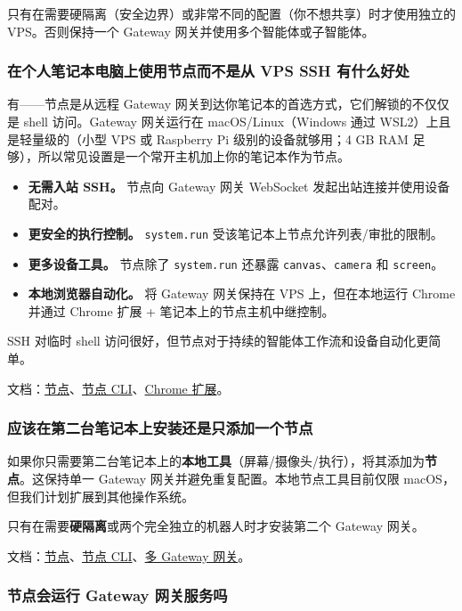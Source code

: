 只有在需要硬隔离（安全边界）或非常不同的配置（你不想共享）时才使用独立的 VPS。否则保持一个 Gateway 网关并使用多个智能体或子智能体。

\subsubsection{在个人笔记本电脑上使用节点而不是从 VPS SSH 有什么好处}


有——节点是从远程 Gateway 网关到达你笔记本的首选方式，它们解锁的不仅仅是 shell 访问。Gateway 网关运行在 macOS/Linux（Windows 通过 WSL2）上且是轻量级的（小型 VPS 或 Raspberry Pi 级别的设备就够用；4 GB RAM 足够），所以常见设置是一个常开主机加上你的笔记本作为节点。

\begin{itemize}
  \item \textbf{无需入站 SSH。} 节点向 Gateway 网关 WebSocket 发起出站连接并使用设备配对。
  \item \textbf{更安全的执行控制。} \texttt{system.run} 受该笔记本上节点允许列表/审批的限制。
  \item \textbf{更多设备工具。} 节点除了 \texttt{system.run} 还暴露 \texttt{canvas}、\texttt{camera} 和 \texttt{screen}。
  \item \textbf{本地浏览器自动化。} 将 Gateway 网关保持在 VPS 上，但在本地运行 Chrome 并通过 Chrome 扩展 + 笔记本上的节点主机中继控制。
\end{itemize}


SSH 对临时 shell 访问很好，但节点对于持续的智能体工作流和设备自动化更简单。

文档：\href{/nodes}{节点}、\href{/cli/nodes}{节点 CLI}、\href{/tools/chrome-extension}{Chrome 扩展}。

\subsubsection{应该在第二台笔记本上安装还是只添加一个节点}


如果你只需要第二台笔记本上的\textbf{本地工具}（屏幕/摄像头/执行），将其添加为\textbf{节点}。这保持单一 Gateway 网关并避免重复配置。本地节点工具目前仅限 macOS，但我们计划扩展到其他操作系统。

只有在需要\textbf{硬隔离}或两个完全独立的机器人时才安装第二个 Gateway 网关。

文档：\href{/nodes}{节点}、\href{/cli/nodes}{节点 CLI}、\href{/gateway/multiple-gateways}{多 Gateway 网关}。

\subsubsection{节点会运行 Gateway 网关服务吗}


